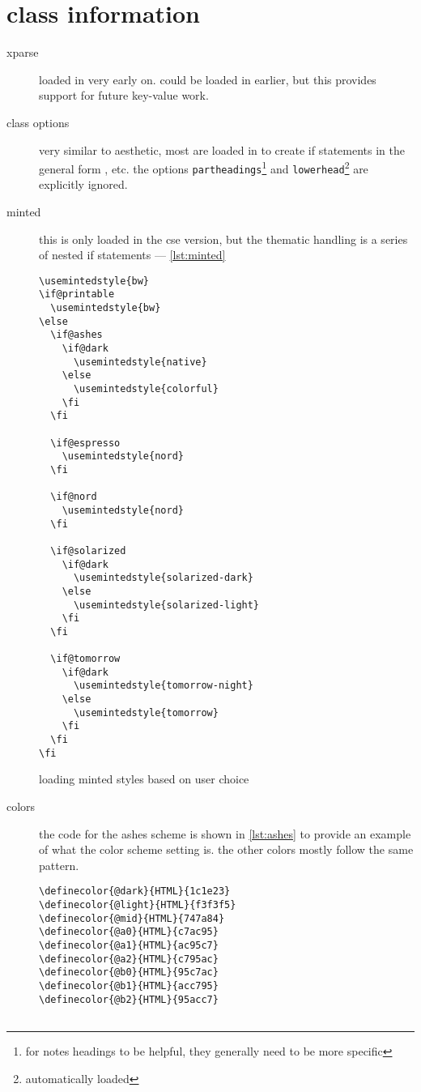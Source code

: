 \documentclass[lowerhead,12pt]{aesthetic}
\begin{document}
\section{class information}
\begin{description}
  \item[xparse] loaded in very early on. could be loaded in earlier, but this provides support for future key-value work.
  \item[class options] very similar to aesthetic, most are loaded in to create if statements in the general form \texttt{\if@dark}, etc. the options \texttt{partheadings}\footnote{for notes headings to be helpful, they generally need to be more specific} and \texttt{lowerhead}\footnote{automatically loaded} are explicitly ignored.
  \item[minted] this is only loaded in the cse version, but the thematic handling is a series of nested if statements --- \vref{lst:minted}
  \begin{listing}
    \begin{verbatim}
\usemintedstyle{bw}
\if@printable
  \usemintedstyle{bw}
\else
  \if@ashes
    \if@dark
      \usemintedstyle{native}
    \else
      \usemintedstyle{colorful}
    \fi
  \fi

  \if@espresso
    \usemintedstyle{nord}
  \fi

  \if@nord
    \usemintedstyle{nord}
  \fi

  \if@solarized
    \if@dark
      \usemintedstyle{solarized-dark}
    \else
      \usemintedstyle{solarized-light}
    \fi
  \fi

  \if@tomorrow
    \if@dark
      \usemintedstyle{tomorrow-night}
    \else
      \usemintedstyle{tomorrow}
    \fi
  \fi
\fi
    \end{verbatim}
    \caption{loading minted styles based on user choice}
    \label{lst:minted}
  \end{listing}
  \item[colors] the code for the ashes scheme is shown in \vref{lst:ashes} to provide an example of what the color scheme setting is. the other colors mostly follow the same pattern.
  \begin{listing}
    \begin{verbatim}
\definecolor{@dark}{HTML}{1c1e23}
\definecolor{@light}{HTML}{f3f3f5}
\definecolor{@mid}{HTML}{747a84}
\definecolor{@a0}{HTML}{c7ac95}
\definecolor{@a1}{HTML}{ac95c7}
\definecolor{@a2}{HTML}{c795ac}
\definecolor{@b0}{HTML}{95c7ac}
\definecolor{@b1}{HTML}{acc795}
\definecolor{@b2}{HTML}{95acc7}


\end{verbatim}
\end{listing}
\end{description}
\end{document}
